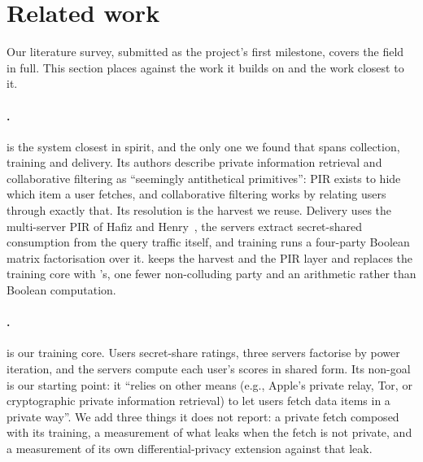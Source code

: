 \section{Related work}
\label{sec:related}

Our literature survey, submitted as the project's first milestone, covers the
field in full. This section places \sys{} against the work it builds on and the
work closest to it.

\paragraph{\pirsonaplain{}.} \pirsona{} is the system closest in spirit, and the
only one we found that spans collection, training and delivery. Its authors
describe private information retrieval and collaborative filtering as
``seemingly antithetical primitives'': PIR exists to hide which item a user
fetches, and collaborative filtering works by relating users through exactly
that. Its resolution is the harvest we reuse. Delivery uses the multi-server PIR
of Hafiz and Henry~\cite{hafiz2019}, the servers extract secret-shared consumption
from the query traffic itself, and training runs a four-party Boolean matrix
factorisation over it. \sys{} keeps the harvest and the PIR layer and replaces
the training core with \nudgeplain{}'s, one fewer non-colluding party and an
arithmetic rather than Boolean computation.

\paragraph{\nudgeplain{}.} \nudge{} is our training core. Users secret-share
ratings, three servers factorise by power iteration, and the servers compute each
user's scores in shared form. Its non-goal is our starting point: it ``relies on
other means (e.g., Apple's private relay, Tor, or cryptographic private
information retrieval) to let users fetch data items in a private way''. We add
three things it does not report: a private fetch composed with its training, a
measurement of what leaks when the fetch is not private, and a measurement of its
own differential-privacy extension against that leak.

